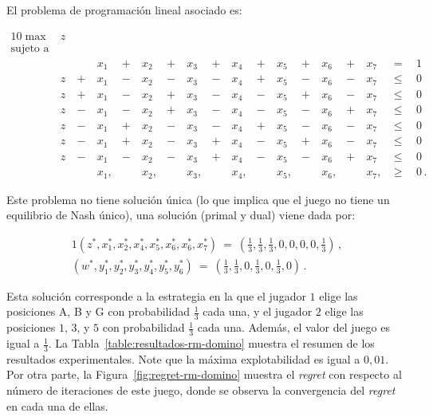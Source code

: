 El problema de programación lineal asociado es:
\begin{samepage}
\begin{alignat}{10}
\max\ &z\ & & & & & & & & & & & & & & & & \\ \nonumber
\text{sujeto a}\ & & & & & & & & & & & & & & & & \\ \nonumber 
	&   &   & x_1\ & +\ & x_2\ & +\ & x_3\ & +\ & x_4\ & +\ & x_5\ & +\ & x_6\ & +\ & x_7\ & \ =\    & \ 1 \\ \nonumber
    &z\ &+\ & x_1\ & -\ & x_2\ & -\ & x_3\ & -\ & x_4\ & +\ & x_5\ & -\ & x_6\ & -\ & x_7\ & \ \leq\ & \ 0 \\ \nonumber
    &z\ &+\ & x_1\ & -\ & x_2\ & +\ & x_3\ & -\ & x_4\ & -\ & x_5\ & +\ & x_6\ & -\ & x_7\ & \ \leq\ & \ 0 \\ \nonumber
    &z\ &-\ & x_1\ & -\ & x_2\ & +\ & x_3\ & -\ & x_4\ & -\ & x_5\ & -\ & x_6\ & +\ & x_7\ & \ \leq\ & \ 0 \\ \nonumber
    &z\ &-\ & x_1\ & +\ & x_2\ & -\ & x_3\ & -\ & x_4\ & +\ & x_5\ & -\ & x_6\ & -\ & x_7\ & \ \leq\ & \ 0 \\ \nonumber
    &z\ &-\ & x_1\ & +\ & x_2\ & -\ & x_3\ & +\ & x_4\ & -\ & x_5\ & +\ & x_6\ & -\ & x_7\ & \ \leq\ & \ 0 \\ \nonumber
    &z\ &-\ & x_1\ & -\ & x_2\ & -\ & x_3\ & +\ & x_4\ & -\ & x_5\ & -\ & x_6\ & +\ & x_7\ & \ \leq\ & \ 0 \\ \nonumber
    &   &   & x_1, &    & x_2, &    & x_3, &    & x_4, &    & x_5, &    &x_6,  &    & x_7, & \ \geq\ & \ 0 \,.
\end{alignat}
\end{samepage}

Este problema no tiene solución única (lo que implica que el juego no tiene un equilibrio de Nash único), una solución (primal y dual) viene dada por:

\begin{alignat}{1}
(z^*, x^*_1, x^*_2, x^*_4, x^*_5, x^*_6, x^*_6, x^*_7)\ =\ \left(\frac{1}{3}, \frac{1}{3}, \frac{1}{3}, 0, 0, 0, 0, \frac{1}{3}\right) \,, \\
(w^*, y^*_1, y^*_2, y^*_3,  y^*_4, y^*_5, y^*_6)\ =\ \left(\frac{1}{3}, \frac{1}{3}, 0, \frac{1}{3}, 0, \frac{1}{3}, 0\right) \,.
\end{alignat}

Esta solución corresponde a la estrategia en la que el jugador $1$ elige las posiciones A, B y G con probabilidad $\frac{1}{3}$ cada una, y el jugador $2$ elige las posiciones $1$, $3$, y $5$ con probabilidad $\frac{1}{3}$ cada una. Además, el valor del juego es igual a $\frac{1}{3}$. La Tabla~\ref{table:resultados-rm-domino} muestra el resumen de los resultados experimentales. Note que la máxima explotabilidad es igual a $0,01$. Por otra parte, la Figura~\ref{fig:regret-rm-domino} muestra el \textit{regret} con respecto al número de iteraciones de este juego, donde se observa la convergencia del \textit{regret} en cada una de ellas.

